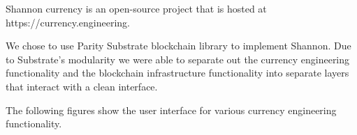 
Shannon currency is an open-source project that is hosted at https://currency.engineering.

We chose to use Parity Substrate blockchain library to implement Shannon. Due to Substrate's
modularity we were able to separate out the currency engineering functionality and the blockchain
infrastructure functionality into separate layers that interact with a clean interface.

The following figures show the user interface for various currency engineering functionality.






